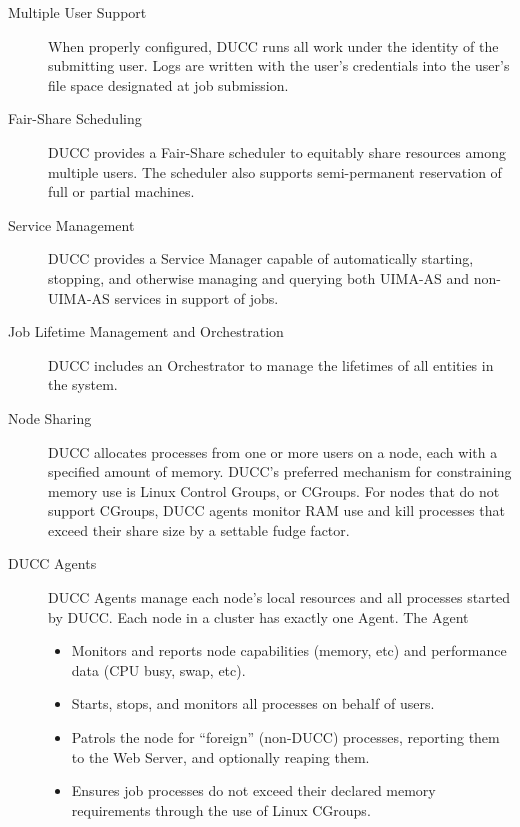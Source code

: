     \begin{description}
        \item[Multiple User Support] When properly configured, 
          DUCC runs all work under the identity of the submitting user. Logs
          are written with the user's credentials into the user's file space designated at job
          submission.

        \item[Fair-Share Scheduling] DUCC provides a Fair-Share scheduler to equitably share
          resources among multiple users.  The scheduler also supports semi-permanent reservation of
          full or partial machines.

        \item[Service Management] DUCC provides a Service Manager capable of automatically starting, stopping, and
          otherwise managing and querying both UIMA-AS and non-UIMA-AS services in support of jobs.

        \item[Job Lifetime Management and Orchestration] DUCC includes an Orchestrator to manage the
          lifetimes of all entities in the system.

        \item[Node Sharing] DUCC allocates processes from one or more users on a node, each with a specified
          amount of memory.  DUCC's preferred mechanism for constraining memory use is Linux
          Control Groups, or CGroups.  For nodes that do not support CGroups, DUCC agents monitor
          RAM use and kill processes that exceed their share size by a settable fudge factor.

        \item[DUCC Agents] DUCC Agents manage each node's local resources and all
          processes started by DUCC. Each node in a cluster has exactly one Agent. The Agent
          \begin{itemize}
            \item Monitors and reports node capabilities (memory, etc) and performance data (CPU busy,
              swap, etc).
            \item Starts, stops, and monitors all processes on behalf of users.
            \item Patrols the node for ``foreign'' (non-DUCC) processes, reporting them to the
              Web Server, and optionally reaping them.
            \item Ensures job processes do not exceed their declared memory requirements
              through the use of Linux CGroups.
          \end{itemize}


\end{description}
